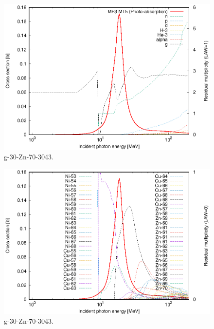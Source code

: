 \begin{figure}
 \includegraphics[width=\linewidth]{eps/g_30-Zn-70_3043.eps}
  \caption{g-30-Zn-70-3043.}
\end{figure}
\begin{figure}
 \includegraphics[width=\linewidth]{eps-law0/g_30-Zn-70_3043.eps}
 \caption{g-30-Zn-70-3043.}
\end{figure}
\newpage \clearpage


